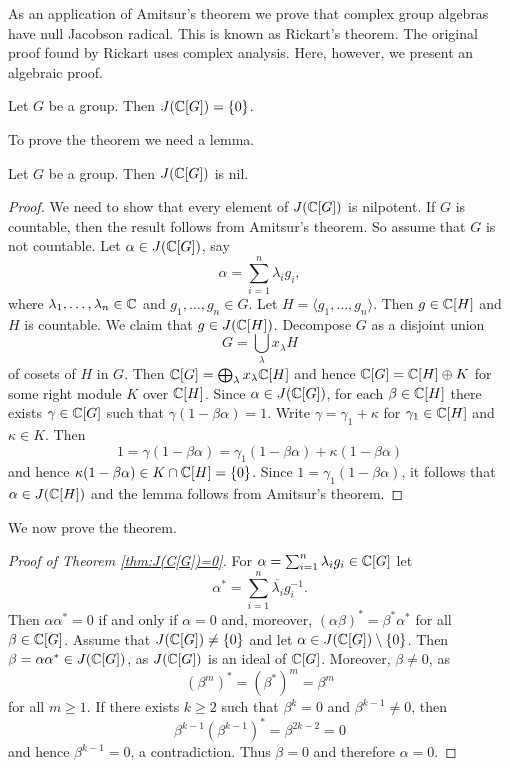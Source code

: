 As an application of Amitsur's theorem we prove that 
complex group algebras have null Jacobson radical.
This is known as 
Rickart's theorem. The original proof found by Rickart 
uses complex analysis. Here, however, 
we present an algebraic proof. 


\begin{theorem}[Rickart]
\label{thm:J(C[G])=0}
    Let $G$ be a group. Then $J(\mathbb{C}[G])=\{0\}$.
\end{theorem}

To prove the theorem we need a lemma.

\begin{lemma}
Let $G$ be a group. Then $J(\mathbb{C}[G])$ is nil.        
\end{lemma}

\begin{proof}
    We need to show that every element of $J(\mathbb{C}[G])$ is nilpotent. 
    If $G$ is countable, then the result follows from Amitsur's theorem. So assume that 
    $G$ is not countable. Let $\alpha\in J(\mathbb{C}[G])$, say
    \[
    \alpha=\sum_{i=1}^n\lambda_ig_i,
    \]
    where $\lambda_1,\dots,\lambda_n\in\mathbb{C}$ and $g_1,\dots,g_n\in G$. Let $H=\langle g_1,\dots,g_n\rangle$.
    Then $g\in \mathbb{C}[H]$ and $H$ is countable. We claim that $g\in J(\mathbb{C}[H])$. Decompose
    $G$ as a disjoint union 
    \[
    G=\bigcup_\lambda x_\lambda H
    \]
    of cosets of $H$ in $G$. Then $\mathbb{C}[G]=\bigoplus_\lambda x_\lambda\mathbb{C}[H]$ and
    hence $\mathbb{C}[G]=\mathbb{C}[H]\oplus K$ for some right module $K$ over $\mathbb{C}[H]$. Since $\alpha\in J(\mathbb{C}[G])$, for each 
    $\beta\in\mathbb{C}[H]$ there exists $\gamma\in\mathbb{C}[G]$ such that 
    $\gamma(1-\beta\alpha)=1$. Write $\gamma=\gamma_1+\kappa$ for $\gamma_1\in\mathbb{C}[H]$ and $\kappa\in K$. Then
    \[
    1=\gamma(1-\beta\alpha)=\gamma_1(1-\beta\alpha)+\kappa(1-\beta\alpha)
    \]
    and hence $\kappa(1-\beta\alpha)\in K\cap \mathbb{C}[H]=\{0\}$. Since $1=\gamma_1(1-\beta\alpha)$, it follows that
    $\alpha\in J(\mathbb{C}[H])$ and the lemma follows from Amitsur's theorem.  
\end{proof}

We now prove the theorem. 

\begin{proof}[Proof of Theorem \ref{thm:J(C[G])=0}]
    For $\alpha=\sum_{i=1}^n\lambda_ig_i\in\mathbb{C}[G]$ let 
    \[
    \alpha^*=\sum_{i=1}^n\overline{\lambda_i}g_i^{-1}.
    \]
    Then $\alpha\alpha^*=0$ if and only if $\alpha=0$ and, moreover, 
    $(\alpha\beta)^*=\beta^*\alpha^*$ for all $\beta\in\mathbb{C}[G]$. 
    Assume that $J(\mathbb{C}[G])\ne\{0\}$ and let $\alpha\in J(\mathbb{C}[G])\setminus\{0\}$. Then
    $\beta=\alpha\alpha^*\in J(\mathbb{C}[G])$, as $J(\mathbb{C}[G])$ is an ideal of $\mathbb{C}[G]$. Moreover, $\beta\ne 0$, as 
    \[
    (\beta^m)^*=(\beta^*)^m=\beta^m
    \]
    for all $m\geq1$. If there exists $k\geq2$ such that $\beta^k=0$ and $\beta^{k-1}\ne 0$, then
    \[
    \beta^{k-1}\left(\beta^{k-1}\right)^*=\beta^{2k-2}=0
    \]
    and hence $\beta^{k-1}=0$, a contradiction. Thus $\beta=0$ and therefore $\alpha=0$. 
\end{proof}

